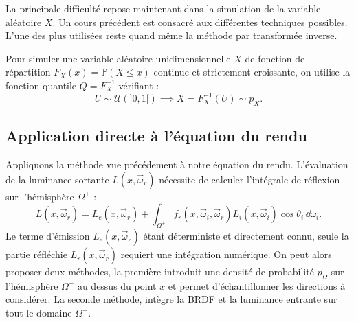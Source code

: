 
La principale difficulté repose maintenant dans la simulation de la variable aléatoire $X$. Un cours précédent est consacré aux différentes techniques possibles. L'une des plus utilisées reste quand même la méthode par transformée inverse. 

\begin{proposition}
    Pour simuler une variable aléatoire unidimensionnelle $X$ de fonction de répartition $F_X(x) = \mathbb{P}(X \leqslant x)$ continue et strictement croissante, on utilise la fonction quantile $Q = F_X^{-1}$ vérifiant :
    \begin{equation}
        U \sim \mathcal{U}(]0, 1[) \implies X = F_X^{-1}(U) \sim p_X.
    \end{equation}
\end{proposition}

\subsection{Application directe à l'équation du rendu}

Appliquons la méthode vue précédement à notre équation du rendu. 
L'évaluation de la luminance sortante $L(x, \vec{\omega}_r)$ nécessite de calculer l'intégrale de réflexion sur l'hémisphère $\Omega^+$ :
\begin{equation}
    L(x, \vec{\omega}_r) = L_e(x, \vec{\omega}_r) + \int_{\Omega^+} f_r(x, \vec{\omega}_i, \vec{\omega}_r) L_i(x, \vec{\omega}_i) \cos\theta_i \, \dd\omega_i.
\end{equation}
Le terme d'émission $L_e(x, \vec{\omega}_r)$ étant déterministe et directement connu, seule la partie réfléchie $L_r(x, \vec{\omega}_r)$ requiert une intégration numérique. On peut alors proposer deux méthodes, la première introduit une densité de probabilité $ p_\Omega$ sur l'hémisphère $ \Omega^+$ au dessus du point $x$ et permet d'échantillonner les directions à considérer. La seconde méthode, intègre la BRDF et la luminance entrante sur tout le domaine $ \Omega^+$. 


